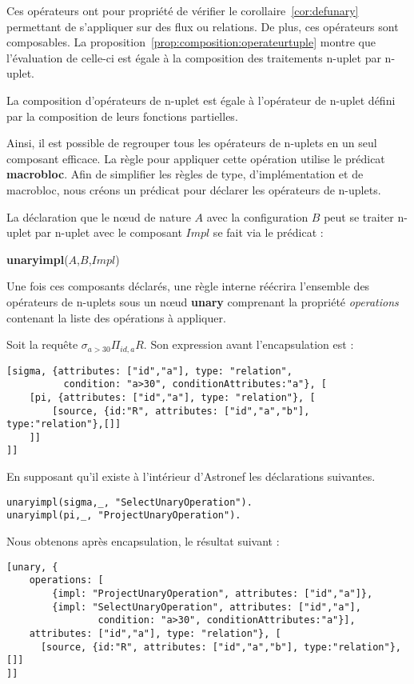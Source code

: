 Ces opérateurs ont pour propriété de vérifier le corollaire~\ref{cor:defunary} permettant de s'appliquer sur des flux ou relations. De plus, ces opérateurs sont composables. La proposition~\ref{prop:composition:operateurtuple} montre que l'évaluation de celle-ci est égale à la composition des traitements n-uplet par n-uplet.
\begin{prop}\label{prop:composition:operateurtuple}
    La composition d'opérateurs de n-uplet est égale à l'opérateur de n-uplet défini par la composition de leurs fonctions partielles.
\end{prop}

Ainsi, il est possible de regrouper tous les opérateurs de n-uplets en un seul composant efficace. La règle pour appliquer cette opération utilise le prédicat \textbf{macrobloc}. Afin de simplifier les règles de type, d'implémentation et de macrobloc, nous créons un prédicat pour déclarer les opérateurs de n-uplets.
\begin{regle}
La déclaration que le nœud de nature $A$ avec la configuration $B$ peut se traiter n-uplet par n-uplet avec le composant $Impl$ se fait via le prédicat :
\begin{center}\textbf{unaryimpl}($A$,$B$,$Impl$)\end{center}
\end{regle}

Une fois ces composants déclarés, une règle interne réécrira l'ensemble des opérateurs de n-uplets sous un nœud \textbf{unary} comprenant la propriété \textit{operations} contenant la liste des opérations à appliquer.
\begin{example}
Soit la requête $\sigma_{a > 30}\Pi_{id,a} R$. Son expression avant l'encapsulation est :
\begin{lstlisting}
[sigma, {attributes: ["id","a"], type: "relation", 
		  condition: "a>30", conditionAttributes:"a"}, [
	[pi, {attributes: ["id","a"], type: "relation"}, [
		[source, {id:"R", attributes: ["id","a","b"], type:"relation"},[]]
	]]
]]
\end{lstlisting}

En supposant qu'il existe à l'intérieur d'Astronef les déclarations suivantes.
\begin{lstlisting}
unaryimpl(sigma,_, "SelectUnaryOperation").
unaryimpl(pi,_, "ProjectUnaryOperation").
\end{lstlisting}

Nous obtenons après encapsulation, le résultat suivant :
\begin{lstlisting}
[unary, {
	operations: [
		{impl: "ProjectUnaryOperation", attributes: ["id","a"]},
		{impl: "SelectUnaryOperation", attributes: ["id","a"], 
				condition: "a>30", conditionAttributes:"a"}], 
	attributes: ["id","a"], type: "relation"}, [
	  [source, {id:"R", attributes: ["id","a","b"], type:"relation"},[]]
]]
\end{lstlisting}
\end{example}


